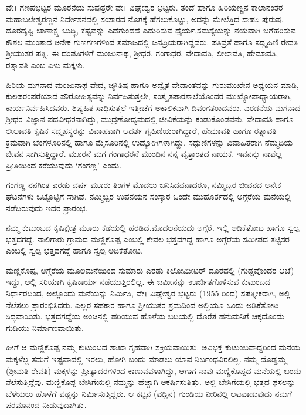 {ವೇ। ಗಣಪಭಟ್ಟರ ಮೂರನೆಯ ಸುಪುತ್ರರೇ ವೇ। ವಿಘ್ನೇಶ್ವರ ಭಟ್ಟರು. ತಂದೆ ಹಾಗೂ ಹಿರಿಯಣ್ಣನ ಕಾಲಾನಂತರ ಮಹಾಬಲೇಶ್ವರಣ್ಣನ ನಿರ್ದೇಶನದಲ್ಲಿ ಸಂಸಾರದ ನೊಗಕ್ಕೆ ಹೆಗಲುಕೊಟ್ಟು, ಅದನ್ನು ಮೇಲೆತ್ತಿದ ಸಾಹಸಿ ಪುರುಷ. ದೂರದೃಷ್ಟಿ ಚಾಣಾಕ್ಷ್ಷ ಬುದ್ಧಿ, ಕಷ್ಟವನ್ನು ಎದೆಗುಂದದೆ ಎದುರಿಸುವ ಧೈರ್ಯ,ಸಮಸ್ಯೆಯನ್ನು ನಯವಾಗಿ ಬಗೆಹರಿಸುವ ಕೌಶಲ ಮುಂತಾದ ಅನೇಕ ಗುಣಗಣಗಳಿಂದ ಸಮಾಜದಲ್ಲಿ ಜನಪ್ರಿಯರಾಗಿದ್ದವರು. ಪತಿವ್ರತೆ ಹಾಗೂ ಸದ್ಗೃಹಿಣಿ ರೇವತಿ ಶ್ರೀಯುತರ ಪತ್ನಿ. ಈ ದಂಪತಿಗಳಿಗೆ ಮಂಜುನಾಥ, ಶ್ರೀಧರ, ಗಂಗಾಧರ, ವೇದಾವತಿ, ಲೀಲಾವತಿ, ಹೇಮಾವತಿ, ರತ್ನಾವತಿ ಎಂಬ ಏಳು ಮಕ್ಕಳು.

ಹಿರಿಯ ಮಗನಾದ ಮಂಜುನಾಥ ವೇದ, ಜ್ಯೌತಿಷ ಹಾಗೂ ಅದ್ವೈತ ವೇದಾಂತವನ್ನು ಗುರುಮುಖೇನ ಅಧ್ಯಯನ ಮಾಡಿ, ಕುಲಪರಂಪರೆಯಾದ ಪೌರೋಹಿತ್ಯವನ್ನು ನಿರ್ವಹಿಸುತ್ತಲೇ, ಸಂಸ್ಕೃತಪಾಠಶಾಲೆಯೊಂದರ ಮುಖ್ಯೋಪಾಧ್ಯಾಯರಾಗಿ, ಕಾರ್ಯನಿರ್ವಹಿಸಿದವರು. ಶಿಷ್ಯಹಿತ ಸಾಧಿಸುತ್ತಲೆ ಇತ್ತೀಚೆಗೆ ಅಕಾಲಿಕವಾಗಿ ದಿವಂಗತರಾದವರು. ಎರಡನೆಯ ಮಗನಾದ ಶ್ರೀಧರ ವಿಜ್ಞಾನ ಪದವೀಧರನಾಗಿದ್ದು, ಮುದ್ರಣೋದ್ಯಮದಲ್ಲಿ ಜೀವಿಕೆಯನ್ನು ಕಂಡುಕೊಂಡವನು. ವೇದಾವತಿ ಹಾಗೂ ಲೀಲಾವತಿ ಕೃಷಿಕ ಸದ್ಗೃಹಸ್ಥರನ್ನು ವಿವಾಹವಾಗಿ ಆದರ್ಶ ಗೃಹಿಣಿಯರಾಗಿದ್ದಾರೆ, ಹೇಮಾವತಿ ಹಾಗೂ ರತ್ನಾವತಿ ಕ್ರಮವಾಗಿ ಬೆಂಗಳೂರಿನಲ್ಲಿ ಹಾಗೂ ಮೈಸೂರಿನಲ್ಲಿ ಉದ್ಯೋಗಿಗಳಾಗಿದ್ದು, ಸದ್ಗುಣಿಗಳನ್ನು ವಿವಾಹಿತರಾಗಿ ನೆಮ್ಮದಿಯ ಜೀವನ ಸಾಗಿಸುತ್ತಿದ್ದಾರೆ. ಮೂರನೆ ಮಗ ಗಂಗಾಧರನೆ ಮುಂದಿನ ನನ್ನ ವೃತ್ತಾಂತದ ನಾಯಕ. ಇವನನ್ನು ನಾವೆಲ್ಲ ಪ್ರೀತಿಯಿಂದ ಕರೆಯುವುದು ‘ಗಂಗಣ್ಣ’ ಎಂದು.

ಗಂಗಣ್ಣ ನನಗಿಂತ ಎರಡು ವರ್ಷ ಮೂರು ತಿಂಗಳ ಮೊದಲು ಜನಿಸಿದವನಾದರೂ, ನಮ್ಮಿಬ್ಬರ ಜೀವನದ ಅನೇಕ ಘಟನೆಗಳು ಒಟ್ಟೊಟ್ಟಿಗೆ ಸಾಗಿವೆ. ನಮ್ಮಿಬ್ಬರ ಉಪನಯನ ಸಂಸ್ಕಾರ ಒಂದೇ ಮುಹೂರ್ತದಲ್ಲಿ ಅಗ್ಗೆರೆಯ ಮನೆಯಲ್ಲಿ ನಡೆದಿರುವುದು ಇದರ ಪ್ರಾರಂಭ.

ನಮ್ಮ ಕುಟುಂಬದ  ಕೃಷಿಕ್ಷೇತ್ರ ಮೂರು ಕಡೆಯಲ್ಲಿ ಹರಡಿದೆ.ಮೊದಲನೆಯದು ಅಗ್ಗೆರೆ. ಇಲ್ಲಿ ಅಡಿಕೆತೋಟ ಹಾಗೂ ಸ್ವಲ್ಪ ಭತ್ತದಗದ್ದೆ. ನಾಲಿಗಾರು ಗ್ರಾಮದ ಮಣ್ಣಿಕೊಪ್ಪ ಎಂಬಲ್ಲಿ ಕೇವಲ ಭತ್ತದಗದ್ದೆ ಹಾಗೂ ಅಗ್ಗೆರೆಯ ಸಮೀಪದ ತಟ್ಟಿಸರ ಎಂಬಲ್ಲಿ ಸ್ವಲ್ಪ ಭತ್ತದಗದ್ದೆ ಹಾಗೂ ಸ್ವಲ್ಪ ಅಡಿಕೆತೋಟ.

ಮಣ್ಣಿಕೊಪ್ಪ, ಅಗ್ಗೆರೆಯ ಮೂಲಮನೆಯಿಂದ ಸುಮಾರು ಎರಡು ಕಿಲೋಮೀಟರ್ ದೂರದಲ್ಲಿ (ಗುಡ್ಡವೊಂದರ ಆಚೆ) ಇದ್ದು, ಅಲ್ಲಿ ಸರಿಯಾಗಿ ಕೃಷಿಕಾರ್ಯ ನಡೆಯುತ್ತಿರಲಿಲ್ಲ. ಈ ಜಮೀನನ್ನು ಊರ್ಜಿತಗೊಳಿಸುವ ಕುಟುಂಬದ ನಿರ್ಧಾರದಿಂದ, ಅಲ್ಲೊಂದು ಮನೆಯನ್ನು ನಿರ್ಮಿಸಿ, ವೇ। ವಿಘ್ನೇಶ್ವರ ಭಟ್ಟರು (1955 ರಿಂದ) ಸಪತ್ನೀಕರಾಗಿ, ಅಲ್ಲಿ ನೆಲೆಸಲು ಪ್ರಾರಂಭಿಸಿದರು. ಎಲ್ಲರ ಸಹಕಾರ ಹಾಗೂ ಶ್ರೀಯುತರ ಶ್ರಮದಿಂದ ಅಲ್ಲಿಯೂ ಒಂದು ಅಡಿಕೆತೋಟ ಸಿದ್ಧವಾಯಿತು. ಭತ್ತದಗದ್ದೆಯ ಅಂಚಿನಲ್ಲಿ ಹರಿಯುವ ಹೊಳೆಯ ಬದಿಯಲ್ಲಿ ದೊರೆತ ಹನುಮನಿಗೆ ಚಿಕ್ಕದೊಂದು  ಗುಡಿಯು ನಿರ್ಮಾಣವಾಯಿತು. 

ಹೀಗೆ ಆ ಮಣ್ಣಿಕೊಪ್ಪ ನಮ್ಮ ಕುಟುಂಬದ ಶಾಖಾ ಗೃಹವಾಗಿ ಸಕ್ರಿಯವಾಯಿತು. ಅವಿಭಕ್ತ ಕುಟುಂಬವಾದ್ದರಿಂದ ಮನೆಯ ಮಕ್ಕಳೆಲ್ಲ ತಮಗೆ ಇಷ್ಟವಾದಲ್ಲಿ ಇರಲು, ಹೋಗಿ  \enginline{-}  ಬಂದು ಮಾಡಲು ಯಾವ ನಿರ್ಬಂಧವಿರಲಿಲ್ಲ.  ನಮ್ಮ ದೊಡ್ಡಮ್ಮ (ಶ್ರೀಮತಿ ರೇವತಿ) ಮಕ್ಕಳನ್ನು ಪ್ರೀತ್ಯಾದರಗಳಿಂದ ಕಾಣುವವಳಾಗಿದ್ದು, ಆಗಾಗ ನಾವು ಮಣ್ಣಿಕೊಪ್ಪದ ಮನೆಯಲ್ಲಿ ಬಂದು ನೆಲೆಸುತ್ತಿದ್ದೆವು. ಮಣ್ಣಿಕೊಪ್ಪ ಬೇಸಿಗೆಯಲ್ಲಿ ನಮ್ಮನ್ನು ಹೆಚ್ಚಾಗಿ ಆಕರ್ಷಿಸುತ್ತಿತ್ತು. ಅಲ್ಲಿ ಬೇಸಿಗೆಯಲ್ಲಿ ಭತ್ತದ ಫಸಲನ್ನು ಬೆಳೆಯಲು ಹೊಳೆಗೆ ವಡ್ಡನ್ನು ನಿರ್ಮಿಸುತ್ತಿದ್ದರು. ಆ ಕಟ್ಟಿನ (ವಡ್ಡಿನ) ಗುಂಡಿಯ ನೀರಿನಲ್ಲಿ ಆಟವಾಡುವುದು ನಮಗೆ ಪರಮಾನಂದ ನೀಡುವುದಾಗಿತ್ತು.

}
